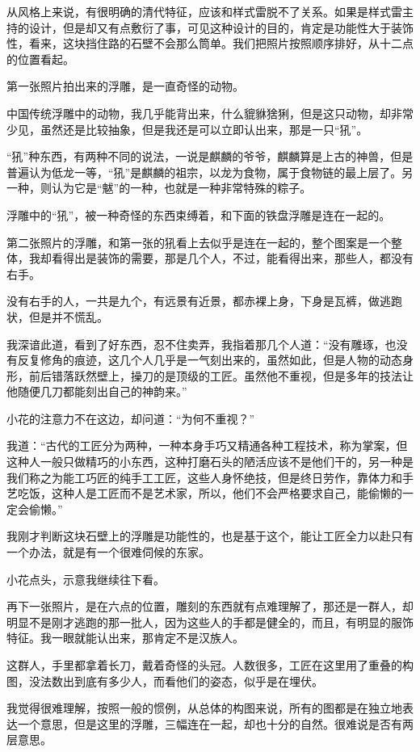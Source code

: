 从风格上来说，有很明确的清代特征，应该和样式雷脱不了关系。如果是样式雷主持的设计，但是却又有点敷衍了事，可见这种设计的目的，肯定是功能性大于装饰性，看来，这块挡住路的石壁不会那么筒单。我们把照片按照顺序排好，从十二点的位置看起。

第一张照片拍出来的浮雕，是一直奇怪的动物。

中国传统浮雕中的动物，我几乎能背出来，什么貔貅猞猁，但是这只动物，却非常少见，虽然还是比较抽象，但是我还是可以立即认出来，那是一只“犼”。

“犼”种东西，有两种不同的说法，一说是麒麟的爷爷，麒麟算是上古的神兽，但是普遍认为低龙一等，“犼”是麒麟的祖宗，以龙为食物，属于食物链的最上层了。另一种，则认为它是“魃”的一种，也就是一种非常特殊的粽子。

浮雕中的“犼”，被一种奇怪的东西束缚着，和下面的铁盘浮雕是连在一起的。

第二张照片的浮雕，和第一张的犼看上去似乎是连在一起的，整个图案是一个整体，我却看得出是装饰的需要，那是几个人，不过，能看得出来，那些人，都没有右手。

没有右手的人，一共是九个，有远景有近景，都赤裸上身，下身是瓦裤，做逃跑状，但是并不慌乱。

我深谙此道，看到了好东西，忍不住卖弄，我指着那几个人道：“没有雕琢，也没有反复修角的痕迹，这几个人几乎是一气刻出来的，虽然如此，但是人物的动态身形，前后错落跃然壁上，操刀的是顶级的工匠。虽然他不重视，但是多年的技法让他随便几刀都能刻出自己的神韵来。”

小花的注意力不在这边，却问道：“为何不重视？”

我道：“古代的工匠分为两种，一种本身手巧又精通各种工程技术，称为掌案，但这种人一般只做精巧的小东西，这种打磨石头的陋活应该不是他们干的，另一种是我们称之为能工巧匠的纯手工工匠，这些人身怀绝技，但是终日劳作，靠体力和手艺吃饭，这种人是工匠而不是艺术家，所以，他们不会严格要求自己，能偷懒的一定会偷懒。”

我刚才判断这块石壁上的浮雕是功能性的，也是基于这个，能让工匠全力以赴只有一个办法，就是有一个很难伺候的东家。

小花点头，示意我继续往下看。

再下一张照片，是在六点的位置，雕刻的东西就有点难理解了，那还是一群人，却明显不是刚才逃跑的那一批人，因为这些人的手都是健全的，而且，有明显的服饰特征。我一眼就能认出来，那肯定不是汉族人。

这群人，手里都拿着长刀，戴着奇怪的头冠。人数很多，工匠在这里用了重叠的构图，没法数出到底有多少人，而看他们的姿态，似乎是在埋伏。

我觉得很难理解，按照一般的惯例，从总体的构图来说，所有的图都是在独立地表达一个意思，但是这里的浮雕，三幅连在一起，却也十分的自然。很难说是否有两层意思。

